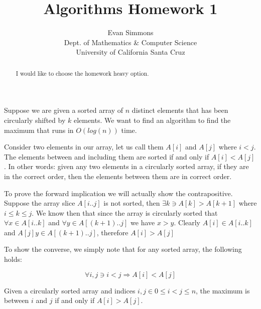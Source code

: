 \documentclass{amsart}
\theoremstyle{definition}
\theoremstyle{remark}
\numberwithin{equation}{section}
\begin{document}
\title[]{Algorithms Homework 1}%
\author{Evan Simmons \\
        Dept. of Mathematics \& Computer Science \\ University of California Santa Cruz}%
\renewcommand{\abstractname}{Homework Option}
\begin{abstract}
I would like to choose the homework heavy option.
\end{abstract}
\maketitle

\section{} Suppose we are given a sorted array of $n$ distinct elements
that has been circularly shifted by $k$ elements. We want to find an
algorithm to find the maximum that runs in $O(log(n))$ time.

\lem \label{lem1}

Consider two elements in our array, let us call them $A[i]$ and $A[j]$
where $i < j$. The elements between and including them are sorted if
and only if $A[i] < A[j]$. In other words: given any two elements in
a circularly sorted array, if they are in the correct order, then the
elements between them are in correct order.

\proof{} 

To prove the forward implication we will actually show the
contrapositive. Suppose the array slice $A[i..j]$ is not sorted, then
$\exists k \ni A[k] > A[k+1]$ where $i \leq k \leq j$. We know then
that since the array is circularly sorted that $\forall x \in A[i..k]$
and $\forall y \in A[(k+1)..j]$ we have $x > y$. Clearly $A[i] \in
A[i..k]$ and $A[j] y \in A[(k+1)..j]$, therefore $A[i] > A[j]$

To show the converse, we simply note that for any sorted array, the
following holds:

$$ \forall i,j \ni i<j \Rightarrow A[i] < A[j] $$

\cor \label{cor1}

Given a circularly sorted array and indices $i,j \in 0 \leq i < j \leq
n$, the maximum is between $i$ and $j$ if and only if $A[i] > A[j]$.

\proof 
\end{document}
